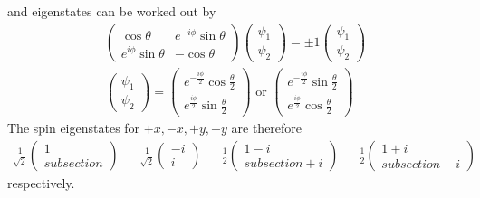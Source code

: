 \documentclass[12pt]{article}
\begin{document}
and eigenstates can be worked out by \begin{gather*}
\begin{pmatrix} \cos \theta &e^{ - i\phi }\sin \theta \\ e^{i\phi }\sin \theta &- \cos \theta  \end{pmatrix} \begin{pmatrix} \psi_1\\ \psi_2 \end{pmatrix} = \pm 1 \begin{pmatrix} \psi_1\\ \psi_2 \end{pmatrix} \\
\begin{pmatrix} \psi_1\\ \psi_2  \end{pmatrix} = \begin{pmatrix} e^{ - \frac{i\phi}{2}} \cos \frac{\theta}{2}\\e^{  \frac{i\phi}{2}} \sin \frac{\theta}{2} \end{pmatrix} \text{ or } \begin{pmatrix} e^{ - \frac{i\phi}{2}} \sin \frac{\theta}{2}\\e^{  \frac{i\phi}{2}} \cos \frac{\theta}{2} \end{pmatrix}
\end{gather*}
The spin eigenstates for \( + x, - x, + y, - y\) are therefore \begin{align*}
\frac{1}{\sqrt{2}}\begin{pmatrix} 1\\subsection{} \end{pmatrix}&& \frac{1}{\sqrt{2}}\begin{pmatrix} - i\\i \end{pmatrix} &&\frac{1}{2}\begin{pmatrix} 1 - i\\subsection{} + i \end{pmatrix}&&\frac{1}{2}\begin{pmatrix} 1 + i\\subsection{} - i \end{pmatrix}
\end{align*}
respectively.
\end{document}
